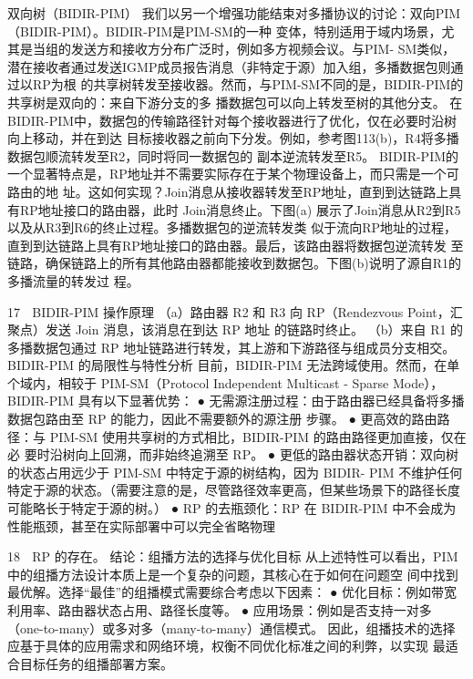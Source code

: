 双向树（BIDIR-PIM）
我们以另一个增强功能结束对多播协议的讨论：双向PIM（BIDIR-PIM）。BIDIR-PIM是PIM-SM的一种
变体，特别适用于域内场景，尤其是当组的发送方和接收方分布广泛时，例如多方视频会议。与PIM-
SM类似，潜在接收者通过发送IGMP成员报告消息（非特定于源）加入组，多播数据包则通过以RP为根
的共享树转发至接收器。然而，与PIM-SM不同的是，BIDIR-PIM的共享树是双向的：来自下游分支的多
播数据包可以向上转发至树的其他分支。
在BIDIR-PIM中，数据包的传输路径针对每个接收器进行了优化，仅在必要时沿树向上移动，并在到达
目标接收器之前向下分发。例如，参考图113(b)，R4将多播数据包顺流转发至R2，同时将同一数据包的
副本逆流转发至R5。
BIDIR-PIM的一个显著特点是，RP地址并不需要实际存在于某个物理设备上，而只需是一个可路由的地
址。这如何实现？Join消息从接收器转发至RP地址，直到到达链路上具有RP地址接口的路由器，此时
Join消息终止。下图(a) 展示了Join消息从R2到R5以及从R3到R6的终止过程。多播数据包的逆流转发类
似于流向RP地址的过程，直到到达链路上具有RP地址接口的路由器。最后，该路由器将数据包逆流转发
至链路，确保链路上的所有其他路由器都能接收到数据包。下图(b)说明了源自R1的多播流量的转发过
程。




                                                       17
                           BIDIR-PIM 操作原理
（a）路由器 R2 和 R3 向 RP（Rendezvous Point，汇聚点）发送 Join 消息，该消息在到达 RP 地址
                             的链路时终止。
  （b）来自 R1 的多播数据包通过 RP 地址链路进行转发，其上游和下游路径与组成员分支相交。
BIDIR-PIM 的局限性与特性分析
目前，BIDIR-PIM 无法跨域使用。然而，在单个域内，相较于 PIM-SM（Protocol Independent
Multicast - Sparse Mode），BIDIR-PIM 具有以下显著优势：
  ● 无需源注册过程：由于路由器已经具备将多播数据包路由至 RP 的能力，因此不需要额外的源注册
    步骤。
  ● 更高效的路由路径：与 PIM-SM 使用共享树的方式相比，BIDIR-PIM 的路由路径更加直接，仅在必
    要时沿树向上回溯，而非始终追溯至 RP。
  ● 更低的路由器状态开销：双向树的状态占用远少于 PIM-SM 中特定于源的树结构，因为 BIDIR-
    PIM 不维护任何特定于源的状态。（需要注意的是，尽管路径效率更高，但某些场景下的路径长度
    可能略长于特定于源的树。）
  ● RP 的去瓶颈化：RP 在 BIDIR-PIM 中不会成为性能瓶颈，甚至在实际部署中可以完全省略物理



                                                               18
  RP 的存在。
  结论：组播方法的选择与优化目标
  从上述特性可以看出，PIM 中的组播方法设计本质上是一个复杂的问题，其核心在于如何在问题空
  间中找到最优解。选择“最佳”的组播模式需要综合考虑以下因素：
● 优化目标：例如带宽利用率、路由器状态占用、路径长度等。
● 应用场景：例如是否支持一对多（one-to-many）或多对多（many-to-many）通信模式。
  因此，组播技术的选择应基于具体的应用需求和网络环境，权衡不同优化标准之间的利弊，以实现
  最适合目标任务的组播部署方案。




